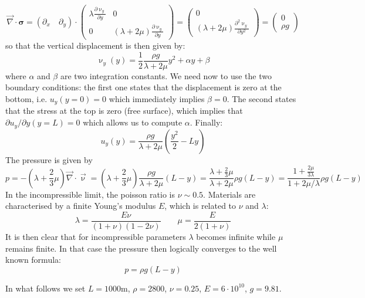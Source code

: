 \[
{\vec \nabla}\cdot {\bm \sigma} =
(\partial_x \quad \partial_y)\cdot 
\left(
\begin{array}{cc}
\lambda \frac{\partial \upnu_y}{\partial y} &  0 \\
0 & (\lambda + 2 \mu) \frac{\partial \upnu_y}{\partial y}
\end{array}
\right)
=
\left(
\begin{array}{c}
0 \\
(\lambda + 2 \mu) \frac{\partial^2 \upnu_y}{\partial y^2}
\end{array}
\right)
=
\left(
\begin{array}{c}
0 \\
\rho g
\end{array}
\right)
\]
so that the vertical displacement is then given by:
\[
\upnu_y(y) = \frac{1}{2} \frac{\rho g}{\lambda + 2 \mu} y^2 + \alpha y + \beta 
\] 
where $\alpha$ and $\beta$ are two integration constants.
We need now to use the two boundary conditions: the first one states that the displacement
is zero at the bottom, i.e. $u_y(y=0)=0$ which immediately implies $\beta=0$.
The second states that the stress at the top is zero (free surface), which implies that 
$\partial u_y/\partial y (y=L)=0$ which allows us to compute $\alpha$.
Finally:
\[
u_y(y) = \frac{\rho g}{\lambda + 2 \mu} (\frac{y^2}{2}-L y) 
\] 
The pressure is given by
\[
p=-(\lambda + \frac{2}{3} \mu) {\vec \nabla}\cdot{\vec\upnu}
= (\lambda + \frac{2}{3} \mu)  \frac{\rho g}{\lambda + 2 \mu} (L -y)
= \frac{\lambda + \frac{2}{3} \mu}{\lambda + 2 \mu} \rho g (L-y)  
= \frac{1 + \frac{2 \mu}{3 \lambda} }{1 + 2 \mu/\lambda} \rho g (L-y)  
\]
In the incompressible limit, the poisson ratio is $\nu \sim 0.5$. 
Materials are characterised by a finite Young's modulus $E$, which is related to 
$\nu$ and $\lambda$:
\[
\lambda=\frac{E \nu}{(1+\nu)(1-2\nu)}
\quad\quad
\mu=\frac{E}{2(1+\nu)}
\]
It is then clear that for incompressible parameters $\lambda$ becomes 
infinite while $\mu$ remains finite. In that case the pressure 
then logically converges to the well known formula:
\[
p=\rho g (L-y)
\]


In what follows we set $L=1000$m, $\rho=2800$, $\nu=0.25$, $E=6\cdot10^{10}$, $g=9.81$.

